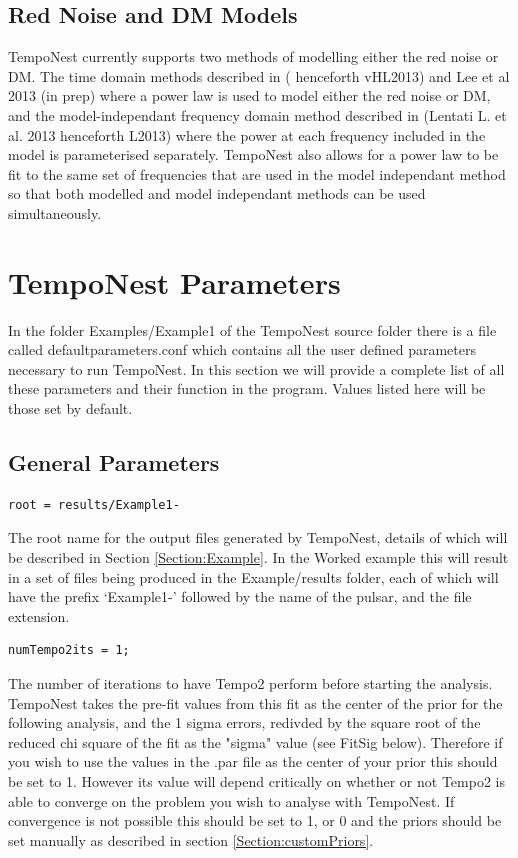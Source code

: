 \documentclass[%
 preprint,
 amsmath,amssymb,amsfonts,
 aps,
]{revtex4-1}
\begin{document}
\subsection{Red Noise and DM Models}

TempoNest currently supports two methods of modelling either the red noise or DM.  The time domain methods described in (\cite{2012arXiv1202.5932V} henceforth vHL2013) and Lee et al 2013 (in prep) where a power law is used to model either the red noise or DM, and the model-independant frequency domain method described in (Lentati L. et al. 2013 henceforth L2013) where the power at each frequency included in the model is parameterised separately.  TempoNest also allows for a power law to be fit to the same set of frequencies that are used in the model independant method so that both modelled and model independant methods can be used simultaneously.


\section{TempoNest Parameters}
\label{Section:params}

In the folder Examples/Example1 of the TempoNest source folder there is a file called defaultparameters.conf which contains all the user defined parameters necessary to run TempoNest.  In this section we will provide a complete list of all these parameters and their function in the program.  Values listed here will be those set by default.

\subsection{General Parameters}

%
\begin{lstlisting}
root = results/Example1-
\end{lstlisting}
%
The root name for the output files generated by TempoNest, details of which will be described in Section \ref{Section:Example}.  In the Worked example this will result in a set of files being produced in the Example/results folder, each of which will have the prefix `Example1-' followed by the name of the pulsar, and the file extension.



\begin{lstlisting}
numTempo2its = 1;
\end{lstlisting}
%
The number of iterations to have Tempo2 perform before starting the analysis.  TempoNest takes the pre-fit values from this fit as the center of the prior for the following analysis, and the 1 sigma errors, redivded by the square root of the reduced chi square of the fit as the "sigma" value (see FitSig below).  Therefore if you wish to use the values in the .par file as the center of your prior this should be set to 1. However its value will depend critically on whether or not Tempo2 is able to converge on the problem you wish to analyse with TempoNest.  If convergence is not possible this should be set to 1, or 0 and the priors should be set manually as described in section \ref{Section:customPriors}.
\end{document}
